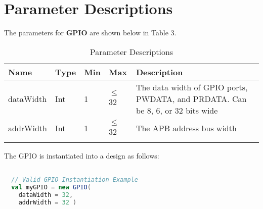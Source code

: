 
\section{Parameter Descriptions}

The parameters for \textbf{GPIO} are shown below in
Table 3.

\renewcommand*{\arraystretch}{1.4}
\begin{longtable}[H]{
    | p{}
    | p{}
    | p{}
    | p{}
    | p{} |
  }
  \hline
  \textbf{Name} &
  \textbf{Type} &
  \textbf{Min}  &
  \textbf{Max}  &
  \textbf{Description}            \\ \hline \hline

  dataWidth   &
  Int       &
  1         &
  $\leq$ 32          &
  The data width of GPIO ports, PWDATA, and PRDATA. Can be 8, 6, or 32 bits wide \\ \hline

  addrWidth     &
  Int           &
  1             &
  $\leq$ 32       &
  The APB address bus width  \\ \hline

  \caption{Parameter Descriptions}\label{table:params}
\end{longtable}

The GPIO is instantiated into a design as follows:

\begin{lstlisting}[language=Scala]

  // Valid GPIO Instantiation Example
  val myGPIO = new GPIO(
    dataWidth = 32, 
    addrWidth = 32 ) 

  \end{lstlisting}